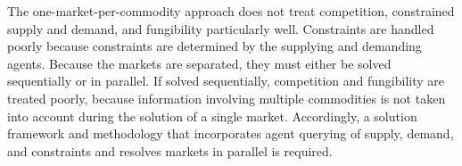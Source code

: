 The one-market-per-commodity approach does not treat competition, constrained
supply and demand, and fungibility particularly well. Constraints are handled
poorly because constraints are determined by the supplying and demanding
agents. Because the markets are separated, they must either be solved
sequentially or in parallel. If solved sequentially, competition and fungibility
are treated poorly, because information involving multiple commodities is not
taken into account during the solution of a single market. Accordingly, a
solution framework and methodology that incorporates agent querying of supply,
demand, and constraints and resolves markets in parallel is required.
